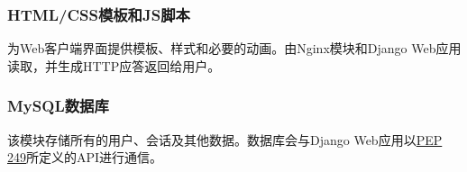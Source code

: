 \subsubsection{HTML/CSS模板和JS脚本}
为Web客户端界面提供模板、样式和必要的动画。由Nginx模块和Django Web应用读取，并生成HTTP应答返回给用户。

\subsubsection{MySQL数据库}
该模块存储所有的用户、会话及其他数据。数据库会与Django Web应用以\href{https://www.python.org/dev/peps/pep-0249}{PEP 249}所定义的API进行通信。






